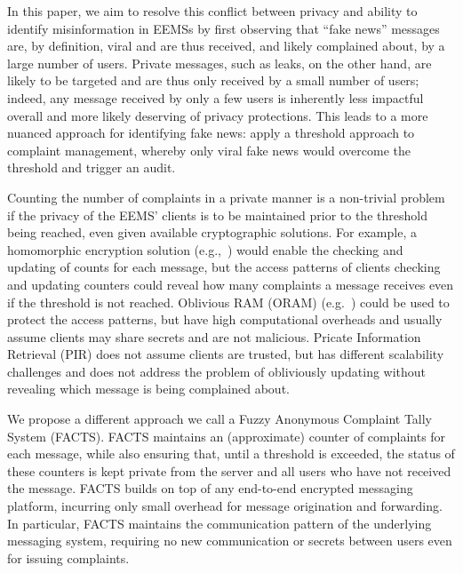 In this paper, we aim to resolve this conflict between privacy and ability to identify misinformation in EEMSs by first observing that ``fake news'' messages are, by definition, viral and are thus received, and likely complained about, by a large number of users.  Private messages, such as leaks, on the other hand, are likely to be targeted and are thus only received by a small number of users; indeed, any message received by only a few users is inherently less impactful overall and more likely deserving of privacy protections.  This leads to a more nuanced approach for identifying fake news: apply a threshold approach to complaint management, whereby only viral fake news would overcome the threshold and trigger an audit. 

Counting the number of complaints in a private manner is a non-trivial problem if the privacy of the EEMS' clients is to be maintained prior to the threshold being reached, even given available cryptographic solutions. For example, a homomorphic encryption solution (e.g.,~\cite{EC:KatMyeOst01}) would enable the checking and updating of counts for each message, but the access patterns of clients checking and updating counters could reveal how many complaints a message receives even if the threshold is not reached. Oblivious RAM  (ORAM) (e.g.~\cite{JACM:GolOst96, JACM:SDSCFRYD18}) could be used to protect the access patterns, but have high computational overheads and usually assume clients may share secrets and are not malicious.
Pricate Information Retrieval (PIR) does not assume clients are trusted, but has different scalability challenges and does not address the problem of obliviously updating without revealing which message is being complained about.

We propose a different approach we call a  Fuzzy Anonymous Complaint Tally System (FACTS).  FACTS maintains an (approximate) counter of complaints for each message, while also ensuring that, until a threshold is exceeded, the status of these counters is kept private from the server and all users who have not received the message.  FACTS builds on top of any end-to-end encrypted messaging platform, incurring only small overhead for message origination and forwarding.  In particular, FACTS maintains the communication pattern of the underlying messaging system, requiring no new communication or secrets between users even for issuing complaints.   

